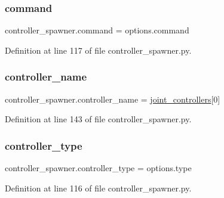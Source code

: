 \subsubsection{\texorpdfstring{command}{command}}
{\footnotesize\ttfamily controller\+\_\+spawner.\+command = options.\+command}



Definition at line 117 of file controller\+\_\+spawner.\+py.

\mbox{\label{namespacecontroller__spawner_a1250390c451d11dbad2361ac6a4d201a}} 
\subsubsection{\texorpdfstring{controller\+\_\+name}{controller\_name}}
{\footnotesize\ttfamily controller\+\_\+spawner.\+controller\+\_\+name = \hyperlink{namespacecontroller__spawner_a4e454e12ceb216c43975a5ad8abee590}{joint\+\_\+controllers}\mbox{[}0\mbox{]}}



Definition at line 143 of file controller\+\_\+spawner.\+py.

\mbox{\label{namespacecontroller__spawner_a6aa09cb289adac00daaf52560e8c93ad}} 
\subsubsection{\texorpdfstring{controller\+\_\+type}{controller\_type}}
{\footnotesize\ttfamily controller\+\_\+spawner.\+controller\+\_\+type = options.\+type}



Definition at line 116 of file controller\+\_\+spawner.\+py.

\mbox{\label{namespacecontroller__spawner_aa2c3433695a7cdd47d625f0c5399f43b}} 
